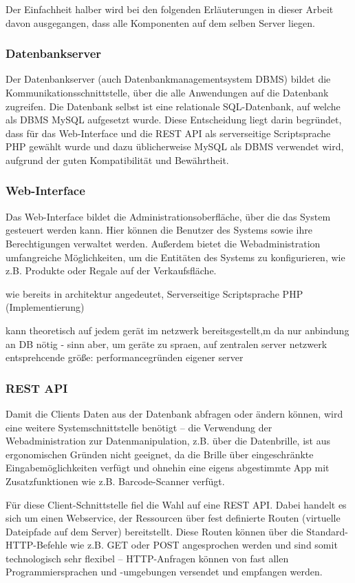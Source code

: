 Der Einfachheit halber wird bei den folgenden Erläuterungen in dieser Arbeit davon ausgegangen, dass alle Komponenten auf dem selben Server liegen.

\subsubsection{Datenbankserver}
Der Datenbankserver (auch Datenbankmanagementsystem \ac{DBMS}) bildet die Kommunikationsschnittstelle, über die alle Anwendungen auf die Datenbank zugreifen. Die Datenbank selbst ist eine relationale \ac{SQL}-Datenbank, auf welche als \ac{DBMS} MySQL aufgesetzt wurde. Diese Entscheidung liegt darin begründet, dass für das Web-Interface und die REST API als serverseitige Scriptsprache \ac{PHP} gewählt wurde und dazu üblicherweise MySQL als DBMS verwendet wird, aufgrund der guten Kompatibilität und Bewährtheit.

\subsubsection{Web-Interface}
Das Web-Interface bildet die Administrationsoberfläche, über die das System gesteuert werden kann. Hier können die Benutzer des Systems sowie ihre Berechtigungen verwaltet werden. Außerdem bietet die Webadministration umfangreiche Möglichkeiten, um die Entitäten des Systems zu konfigurieren, wie z.B. Produkte oder Regale auf der Verkaufsfläche.



wie bereits in architektur angedeutet, Serverseitige Scriptsprache PHP (Implementierung)

kann theoretisch auf jedem gerät im netzwerk bereitsgestellt,m da nur anbindung an DB nötig - sinn aber, um geräte zu spraen, auf zentralen server
netzwerk entsprehcende größe: performancegründen eigener server

\subsubsection{\ac{REST} \ac{API}}
Damit die Clients Daten aus der Datenbank abfragen oder ändern können, wird eine weitere Systemschnittstelle benötigt -- die Verwendung der Webadministration zur Datenmanipulation, z.B. über die Datenbrille, ist aus ergonomischen Gründen nicht geeignet, da die Brille über eingeschränkte Eingabemöglichkeiten verfügt und ohnehin eine eigens abgestimmte App mit Zusatzfunktionen wie z.B. Barcode-Scanner verfügt.

Für diese Client-Schnittstelle fiel die Wahl auf eine REST API. Dabei handelt es sich um einen Webservice, der Ressourcen über fest definierte Routen (virtuelle Dateipfade auf dem Server) bereitstellt. Diese Routen können über die Standard-HTTP-Befehle wie z.B. GET oder POST angesprochen werden und sind somit technologisch sehr flexibel -- HTTP-Anfragen können von fast allen Programmiersprachen und -umgebungen versendet und empfangen werden.

